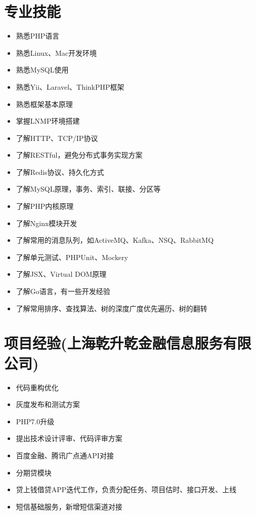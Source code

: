 \documentclass[a4paper,12pt]{article}
\begin{document}
\begin{CJK}{UTF8}{gbsn}
		\section{专业技能}
			\begin{itemize}
				\item{熟悉PHP语言}
				\item{熟悉Linux、Mac开发环境}
				\item{熟悉MySQL使用}
				\item{熟悉Yii、Laravel、ThinkPHP框架}
				\item{熟悉框架基本原理}
				\item{掌握LNMP环境搭建}
				\item{了解HTTP、TCP/IP协议}
				\item{了解RESTful，避免分布式事务实现方案}
				\item{了解Redis协议、持久化方式}
				\item{了解MySQL原理，事务、索引、联接、分区等}
				\item{了解PHP内核原理}
				\item{了解Nginx模块开发}
				\item{了解常用的消息队列，如ActiveMQ、Kafka、NSQ、RabbitMQ}
				\item{了解单元测试、PHPUnit、Mockery}
				\item{了解JSX、Virtual DOM原理}
				\item{了解Go语言，有一些开发经验}
				\item{了解常用排序、查找算法、树的深度广度优先遍历、树的翻转}
			\end{itemize}
		
		\section{项目经验(上海乾升乾金融信息服务有限公司)}
			\begin{itemize}
				\item{代码重构优化}
				\item{灰度发布和测试方案}
                			\item{PHP7.0升级}
                			\item{提出技术设计评审、代码评审方案} 
				\item{百度金融、腾讯广点通API对接}
				\item{分期贷模块}
				\item{贷上钱借贷APP迭代工作，负责分配任务、项目估时、接口开发、上线}
				\item{短信基础服务，新增短信渠道对接}
			\end{itemize}
			

\end{CJK}
\end{document}
